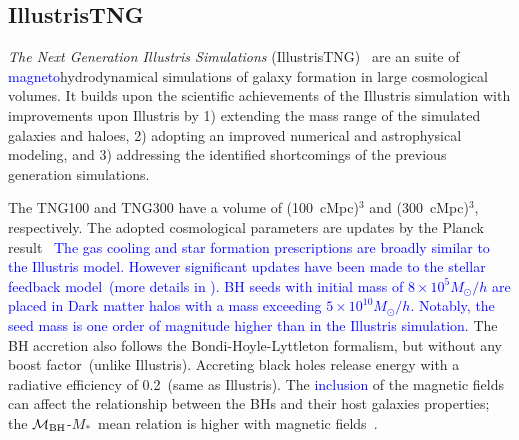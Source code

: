 \documentclass[twocolumn]{aastex631}
\newcommand{\yo}[1]{\textcolor{purple}{[{\bf Yohan}: #1]}}
\def\smass{{$M_*$}}
\def\mbh{$\mathcal M_{\rm BH}$}
\newcommand{\aklant}[1]{\textcolor{blue}{#1}}
\begin{document}


\subsection{IllustrisTNG}
{\it The Next Generation Illustris Simulations} (IllustrisTNG)~\citep{2018MNRAS.475..676S, Pillepich2018} are 
an suite of \aklant{magneto}hydrodynamical simulations of galaxy formation in large cosmological volumes. It builds upon the scientific achievements of the Illustris simulation with improvements upon Illustris by 1) extending the mass range of the simulated galaxies and haloes, 2) adopting an improved numerical and astrophysical modeling, and 3) addressing the identified shortcomings of the previous generation simulations.

The TNG100 and TNG300 have a volume of (100~cMpc)$^3$ and (300~cMpc)$^3$, respectively. The adopted cosmological parameters are updates by the Planck result~\citep{2016A&A...594A..13P}
\aklant{The gas cooling and star formation prescriptions are broadly similar to the Illustris model. However significant updates have been made to the stellar feedback model~(more details in \citealt{2018MNRAS.473.4077P}).
BH seeds with initial mass of $8 \times 10^5 M_{\odot}/h$ are placed in Dark matter halos with a mass exceeding $5 \times 10^{10} M_{\odot}/h$. Notably, the seed mass is one order of magnitude higher than in the Illustris simulation.} The BH accretion also follows the Bondi-Hoyle-Lyttleton formalism, but without any boost factor~(unlike Illustris). Accreting black holes release energy with a radiative efficiency of 0.2~(same as Illustris). The \aklant{inclusion} of the magnetic fields can affect the relationship between the BHs and their host galaxies properties; the \mbh-\smass\ mean relation is higher with magnetic fields~\citep{2018MNRAS.473.4077P}. %
\end{document}
